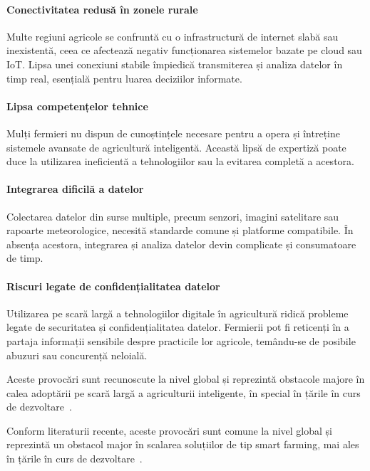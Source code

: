 \documentclass[runningheads,a4paper,11pt,twoside]{report}
\begin{document}
\paragraph{Conectivitatea redusă în zonele rurale} Multe regiuni agricole se confruntă cu o infrastructură de internet slabă sau inexistentă, ceea ce afectează negativ funcționarea sistemelor bazate pe cloud sau IoT. Lipsa unei conexiuni stabile împiedică transmiterea și analiza datelor în timp real, esențială pentru luarea deciziilor informate.

\paragraph{Lipsa competențelor tehnice} Mulți fermieri nu dispun de cunoștințele necesare pentru a opera și întreține sistemele avansate de agricultură inteligentă. Această lipsă de expertiză poate duce la utilizarea ineficientă a tehnologiilor sau la evitarea completă a acestora.

\paragraph{Integrarea dificilă a datelor} Colectarea datelor din surse multiple, precum senzori, imagini satelitare sau rapoarte meteorologice, necesită standarde comune și platforme compatibile. În absența acestora, integrarea și analiza datelor devin complicate și consumatoare de timp.

\paragraph{Riscuri legate de confidențialitatea datelor} Utilizarea pe scară largă a tehnologiilor digitale în agricultură ridică probleme legate de securitatea și confidențialitatea datelor. Fermierii pot fi reticenți în a partaja informații sensibile despre practicile lor agricole, temându-se de posibile abuzuri sau concurență neloială.

Aceste provocări sunt recunoscute la nivel global și reprezintă obstacole majore în calea adoptării pe scară largă a agriculturii inteligente, în special în țările în curs de dezvoltare~\cite{wolfert2017big,kamilaris2017bigdata}.

Conform literaturii recente, aceste provocări sunt comune la nivel global și reprezintă un obstacol major în scalarea soluțiilor de tip smart farming, mai ales în țările în curs de dezvoltare~\cite{wolfert2017big,kamilaris2017bigdata}.
\end{document}
